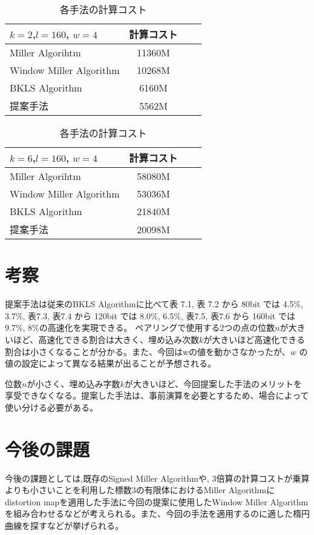 \begin{table}[htbp]
 \begin{center}
  \begin{tabular}{|l|c|c|c|}
  \hline
  $k=2$,$l=160$, $w=4$ & 計算コスト \\
  \hline
  Miller Algorihtm & 11360M \\
  \hline
  Window Miller Algorithm & 10268M \\
  \hline
  BKLS Algorithm &  6160M \\
  \hline
  提案手法 & 5562M \\
  \hline
  \end{tabular}
 \end{center}
 \caption{各手法の計算コスト}
\end{table}

\begin{table}[htbp]
 \begin{center}
  \begin{tabular}{|l|c|c|c|}
  \hline
  $k=6$,$l=160$, $w=4$ & 計算コスト \\
  \hline
  Miller Algorihtm & 58080M \\
  \hline
  Window Miller Algorithm & 53036M \\
  \hline
  BKLS Algorithm &  21840M \\
  \hline
  提案手法 & 20098M \\
  \hline
  \end{tabular}
 \end{center}
 \caption{各手法の計算コスト}
\end{table}

\par
\par
\section{考察}

提案手法は従来のBKLS Algorithmに比べて表 7.1, 表 7.2 から 80bit では 4.5\%, 3.7\%, 表7.3, 表7.4 から 120bit では 8.0\%, 6.5\%, 表7.5, 表7.6 から 160bit では 9.7\%, 8\%の高速化を実現できる。
ペアリングで使用する2つの点の位数$n$が大きいほど、高速化できる割合は大きく、埋め込み次数$k$が大きいほど高速化できる割合は小さくなることが分かる。また、今回はwの値を動かさなかったが、$w$ の値の設定によって異なる結果が出ることが予想される。
\par
位数$n$が小さく、埋め込み字数$k$が大きいほど、今回提案した手法のメリットを享受できなくなる。提案した手法は、事前演算を必要とするため、場合によって使い分ける必要がある。

\section{今後の課題}
今後の課題としては,既存のSigned Miller Algorithmや, 3倍算の計算コストが乗算よりも小さいことを利用した標数3の有限体におけるMiller Algorithmにdistortion mapを適用した手法に今回の提案に使用したWindow Miller Algorithmを組み合わせるなどが考えられる。また、今回の手法を適用するのに適した楕円曲線を探すなどが挙げられる。
